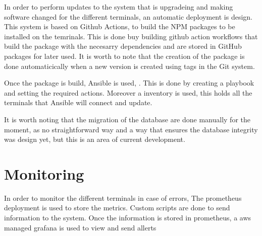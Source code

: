In order to perform updates to the system that is upgradeing and making software changed for the different terminals, an automatic deployment is design. This system is based on Github Actions, to build the NPM packages to be installed on the temrinals. This is done buy building github action workflows that build the package with the necesarry dependencies and are stored in GitHub packages for later used. It is worth to note that the creation of the package is done automaticically when a new version is created using tags in the Git system.

Once the package is build, Ansible is used, . This is done by creating a playbook and setting the required actions. Moreover a inventory is used, this holds all the terminals that Ansible will  connect and update.


It is worth noting that the migration of the database are done manually for the moment, as no straightforward way and a way that ensures the database integrity was design yet, but this is an area of current development.


\section{Monitoring}

In order to monitor the different terminals in case of errors, The prometheus deployment is used to store the metrics. Custom scripts are done to send information to the system. Once the information is stored in prometheus, a aws managed grafana is used to view and send allerts



